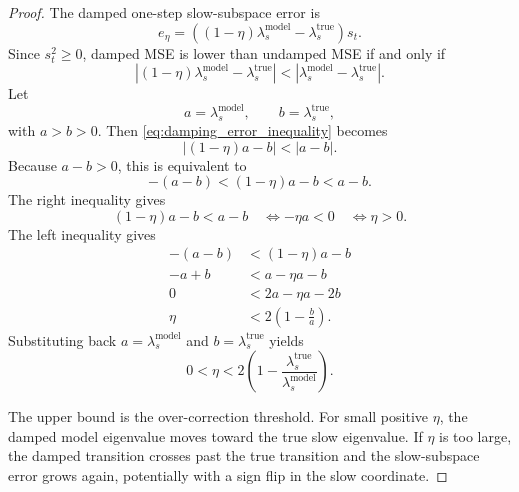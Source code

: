 \begin{proof}
The damped one-step slow-subspace error is
\begin{equation}
    e_\eta
    =
    \left(
        (1-\eta)\lambda_s^{\mathrm{model}}
        -
        \lambda_s^{\mathrm{true}}
    \right)s_t.
\end{equation}
Since $s_t^2 \geq 0$, damped MSE is lower than undamped MSE if and only if
\begin{equation}
    \left|
        (1-\eta)\lambda_s^{\mathrm{model}}
        -
        \lambda_s^{\mathrm{true}}
    \right|
    <
    \left|
        \lambda_s^{\mathrm{model}}
        -
        \lambda_s^{\mathrm{true}}
    \right|.
    \label{eq:damping_error_inequality}
\end{equation}
Let
\begin{equation}
    a=\lambda_s^{\mathrm{model}},
    \qquad
    b=\lambda_s^{\mathrm{true}},
\end{equation}
with $a>b>0$. Then \eqref{eq:damping_error_inequality} becomes
\begin{equation}
    |(1-\eta)a-b| < |a-b|.
\end{equation}
Because $a-b>0$, this is equivalent to
\begin{equation}
    -(a-b) < (1-\eta)a-b < a-b.
\end{equation}
The right inequality gives
\begin{equation}
    (1-\eta)a-b < a-b
    \quad
    \Longleftrightarrow
    -\eta a < 0
    \quad
    \Longleftrightarrow
    \eta > 0.
\end{equation}
The left inequality gives
\begin{align}
    -(a-b) &< (1-\eta)a-b \\
    -a+b &< a-\eta a-b \\
    0 &< 2a - \eta a - 2b \\
    \eta &< 2\left(1-\frac{b}{a}\right).
\end{align}
Substituting back $a=\lambda_s^{\mathrm{model}}$ and
$b=\lambda_s^{\mathrm{true}}$ yields
\begin{equation}
    0 < \eta
    <
    2\left(1 -
    \frac{\lambda_s^{\mathrm{true}}}{\lambda_s^{\mathrm{model}}}
    \right).
\end{equation}

The upper bound is the over-correction threshold. For small positive $\eta$,
the damped model eigenvalue moves toward the true slow eigenvalue. If $\eta$ is
too large, the damped transition crosses past the true transition and the
slow-subspace error grows again, potentially with a sign flip in the slow
coordinate.


\end{proof}
